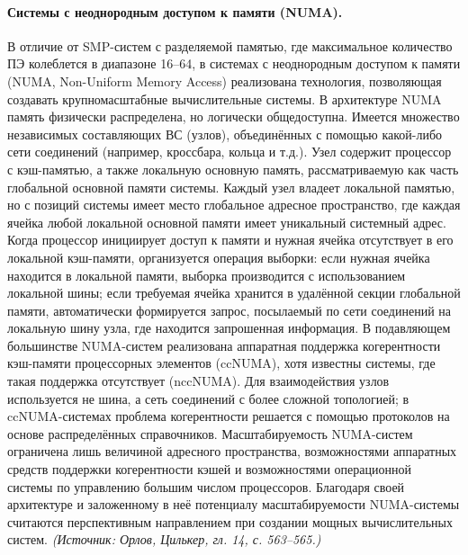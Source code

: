 \documentclass[a4paper,12pt]{article}
\begin{document}
\paragraph{Системы с неоднородным доступом к памяти (NUMA).}
В отличие от SMP-систем с разделяемой памятью, где максимальное количество ПЭ колеблется в диапазоне 16--64, в системах с неоднородным доступом к памяти (NUMA, Non-Uniform Memory Access) реализована технология, позволяющая создавать крупномасштабные вычислительные системы. В архитектуре NUMA память физически распределена, но логически общедоступна. Имеется множество независимых составляющих ВС (узлов), объединённых с помощью какой-либо сети соединений (например, кроссбара, кольца и т.д.). Узел содержит процессор с кэш-памятью, а также локальную основную память, рассматриваемую как часть глобальной основной памяти системы. Каждый узел владеет локальной памятью, но с позиций системы имеет место глобальное адресное пространство, где каждая ячейка любой локальной основной памяти имеет уникальный системный адрес. Когда процессор инициирует доступ к памяти и нужная ячейка отсутствует в его локальной кэш-памяти, организуется операция выборки: если нужная ячейка находится в локальной памяти, выборка производится с использованием локальной шины; если требуемая ячейка хранится в удалённой секции глобальной памяти, автоматически формируется запрос, посылаемый по сети соединений на локальную шину узла, где находится запрошенная информация. В подавляющем большинстве NUMA-систем реализована аппаратная поддержка когерентности кэш-памяти процессорных элементов (ccNUMA), хотя известны системы, где такая поддержка отсутствует (nccNUMA). Для взаимодействия узлов используется не шина, а сеть соединений с более сложной топологией; в ccNUMA-системах проблема когерентности решается с помощью протоколов на основе распределённых справочников. Масштабируемость NUMA-систем ограничена лишь величиной адресного пространства, возможностями аппаратных средств поддержки когерентности кэшей и возможностями операционной системы по управлению большим числом процессоров. Благодаря своей архитектуре и заложенному в неё потенциалу масштабируемости NUMA-системы считаются перспективным направлением при создании мощных вычислительных систем.
\textit{(Источник: Орлов, Цилькер, гл. 14, с. 563--565.)}
\end{document}
